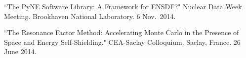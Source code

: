 \begin{bibsection}





\item ``The PyNE Software Library: A Framework for ENSDF?" Nuclear Data Week Meeting. Brookhaven National Laboratory. 6 Nov.\ 2014. 



\item ``The Resonance Factor Method: Accelerating Monte Carlo in the Presence of Space and Energy Self-Shielding." CEA-Saclay Colloquium. Saclay, France. 26 June 2014.




\end{bibsection}
